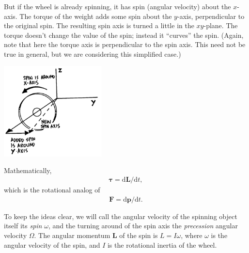 But if the wheel is already spinning, it has spin (angular velocity) about the \(x\)-axis. The torque of the weight adds some spin about the \(y\)-axis, perpendicular to the original spin.  The resulting spin axis is turned a little in the \(xy\)-plane.  The torque doesn't change the value of the spin; instead it ``curves'' the spin.  (Again, note that here the torque axis is perpendicular to the spin axis.  This need not be true in general, but we are considering this simplified case.)
\begin{center} \includegraphics*[width=0.4\textwidth]{imgs/6labs/6Alab/6Aexp7/6A_exp7_TorquedSpinningWheel.png} \end{center}
Mathematically,
\begin{align} \boldsymbol{\tau} = \textrm{d}\textbf{L}/\textrm{d}t, \label{6Aexp7_eqn_5} \end{align}
which is the rotational analog of
\begin{align} \textbf{F} = \textrm{d}\textbf{p}/\textrm{d}t. \end{align}

To keep the ideas clear, we will call the angular velocity of the spinning object itself its \textit{spin} \(\omega\), and the turning around of the spin axis the \textit{precession} angular velocity \(\Omega\).  The angular momentum \(\textbf{L}\) of the spin is \(L = I\omega\), where \(\omega\) is the angular velocity of the spin, and \(I\) is the rotational inertia of the wheel.

